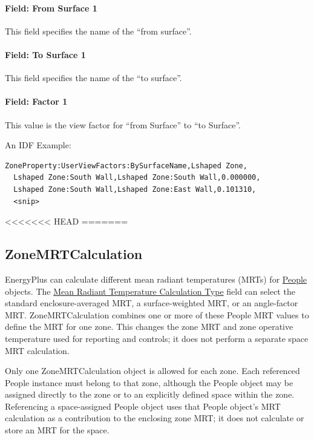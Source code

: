 \paragraph{Field: From Surface 1}\label{field-from-surface-1}

This field specifies the name of the ``from surface''.

\paragraph{Field: To Surface 1}\label{field-to-surface-1}

This field specifies the name of the ``to surface''.

\paragraph{Field: Factor 1}\label{field-factor-1}

This value is the view factor for ``from Surface'' to ``to Surface''.

An IDF Example:

\begin{lstlisting}
ZoneProperty:UserViewFactors:BySurfaceName,Lshaped Zone,
  Lshaped Zone:South Wall,Lshaped Zone:South Wall,0.000000,
  Lshaped Zone:South Wall,Lshaped Zone:East Wall,0.101310,
  <snip>
\end{lstlisting}
<<<<<<< HEAD
=======

\subsection{ZoneMRTCalculation}\label{zonemrtcalculation}

EnergyPlus can calculate different mean radiant temperatures (MRTs) for \hyperref[people]{People} objects. The \hyperref[field-mean-radiant-temperature-calculation-type]{Mean Radiant Temperature Calculation Type} field can select the standard enclosure-averaged MRT, a surface-weighted MRT, or an angle-factor MRT. ZoneMRTCalculation combines one or more of these People MRT values to define the MRT for one zone. This changes the zone MRT and zone operative temperature used for reporting and controls; it does not perform a separate space MRT calculation.

Only one ZoneMRTCalculation object is allowed for each zone. Each referenced People instance must belong to that zone, although the People object may be assigned directly to the zone or to an explicitly defined space within the zone. Referencing a space-assigned People object uses that People object's MRT calculation as a contribution to the enclosing zone MRT; it does not calculate or store an MRT for the space.

